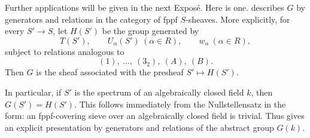 Further applications will be given in the next Exposé. Here is one.
 describes \(G\) by generators and relations in the
category of fppf \(S\)-sheaves. More explicitly, for every
\(S'\to S\), let \(H(S')\) be the group generated by
\[
  T(S'),\qquad U_\alpha(S')\ (\alpha\in R),\qquad
  w_\alpha\ (\alpha\in R),
\]
subject to relations analogous to
\[
  (1),\ \ldots,\ (3_2),\ (A),\ (B).
\]
Then \(G\) is the sheaf associated with the presheaf
\(S'\mapsto H(S')\).

In particular, if \(S'\) is the spectrum of an algebraically closed
field \(k\), then \(G(S')=H(S')\). This follows immediately from the
Nullstellensatz in the form: an fppf-covering sieve over an
algebraically closed field is trivial. Thus  gives an
explicit presentation by generators and relations of the abstract
group \(G(k)\).
